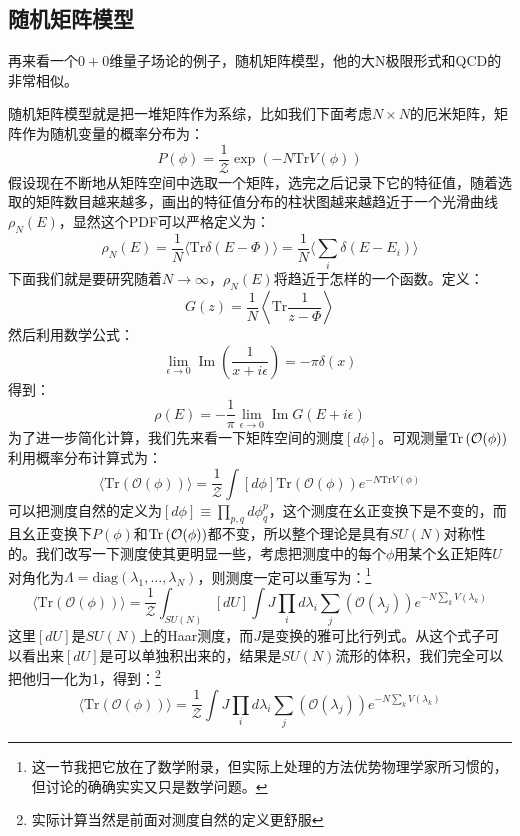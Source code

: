 \subsection{随机矩阵模型}
再来看一个$0+0$维量子场论的例子，随机矩阵模型，他的大N极限形式和QCD的非常相似。

随机矩阵模型就是把一堆矩阵作为系综，比如我们下面考虑$N\times N$的厄米矩阵，矩阵作为随机变量的概率分布为：
\begin{equation}
	P(\phi)=\frac1{\mathcal{Z}}\exp{(-N\text{Tr}V(\phi))}
\end{equation}
假设现在不断地从矩阵空间中选取一个矩阵，选完之后记录下它的特征值，随着选取的矩阵数目越来越多，画出的特征值分布的柱状图越来越趋近于一个光滑曲线$\rho_N(E)$，显然这个PDF可以严格定义为：
\begin{equation}
	\rho_N(E)=\frac1N\langle\text{Tr}\delta(E-\Phi)\rangle=\frac1N\langle\sum_i\delta(E-E_i)\rangle 
\end{equation}
下面我们就是要研究随着$N\to\infty$，$\rho_N(E)$将趋近于怎样的一个函数。定义：
\begin{equation}
	G(z)=\frac1N\left\langle\text{Tr}\frac1{z-\Phi} \right\rangle
\end{equation}
然后利用数学公式：
\begin{equation}
	\operatorname*{lim}_{\epsilon\to0}\operatorname{Im}(\frac{1}{x+i\epsilon})=-\pi\delta(x)
\end{equation}
得到：
\begin{equation}
	\rho(E)=-\frac 1\pi\lim_{\epsilon\to0}\operatorname{Im}G(E+i\epsilon)
\end{equation}
为了进一步简化计算，我们先来看一下矩阵空间的测度$[d\phi]$。可观测量$\Tr\left(\mathcal{O}(\phi)\right)$利用概率分布计算式为：
\begin{equation}
	\langle\mathrm{Tr}(\mathcal{O}(\phi))\rangle=\frac1{\mathcal{Z}}\int[d\phi]\mathrm{Tr}(\mathcal{O}(\phi))e^{-N\mathrm{Tr}V(\phi)}
\end{equation}
可以把测度自然的定义为$[d\phi]\equiv\prod_{p,q}d\phi^p_q$，这个测度在幺正变换下是不变的，而且幺正变换下$P(\phi)$和$\Tr\left(\mathcal{O}(\phi)\right)$都不变，所以整个理论是具有$SU(N)$对称性的。我们改写一下测度使其更明显一些，考虑把测度中的每个$\phi$用某个幺正矩阵$U$对角化为$\Lambda=\mathrm{diag}(\lambda_1,\ldots,\lambda_N)$，则测度一定可以重写为：\footnote{这一节我把它放在了数学附录，但实际上处理的方法优势物理学家所习惯的，但讨论的确确实实又只是数学问题。}
\begin{equation}
	\langle\mathrm{Tr}(\mathcal{O}(\phi))\rangle=\frac1{\mathcal{Z}}\int_{SU(N)}[dU]\int J\prod_id\lambda_i\sum_j(\mathcal{O}(\lambda_j))e^{-N\sum_kV(\lambda_k)}
\end{equation}
这里$[dU]$是$SU(N)$上的Haar测度，而$J$是变换的雅可比行列式。从这个式子可以看出来$[dU]$是可以单独积出来的，结果是$SU(N)$流形的体积，我们完全可以把他归一化为1，得到：\footnote{实际计算当然是前面对测度自然的定义更舒服}
\begin{equation}\label{B.47}
	\langle\mathrm{Tr}(\mathcal{O}(\phi))\rangle=\frac1{\mathcal{Z}}\int J\prod_id\lambda_i\sum_j(\mathcal{O}(\lambda_j))e^{-N\sum_kV(\lambda_k)}
\end{equation}

